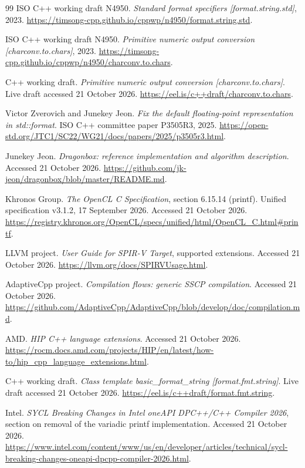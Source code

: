 \documentclass[11pt,letterpaper]{article}
\begin{document}
\begin{thebibliography}{99}
ISO C++ working draft N4950.
\emph{Standard format specifiers [format.string.std]}, 2023.
\url{https://timsong-cpp.github.io/cppwp/n4950/format.string.std}.

ISO C++ working draft N4950.
\emph{Primitive numeric output conversion [charconv.to.chars]}, 2023.
\url{https://timsong-cpp.github.io/cppwp/n4950/charconv.to.chars}.

C++ working draft.
\emph{Primitive numeric output conversion [charconv.to.chars]}.
Live draft accessed 21 October 2026.
\url{https://eel.is/c++draft/charconv.to.chars}.

Victor Zverovich and Junekey Jeon.
\emph{Fix the default floating-point representation in std::format}.
ISO C++ committee paper P3505R3, 2025.
\url{https://open-std.org/JTC1/SC22/WG21/docs/papers/2025/p3505r3.html}.

Junekey Jeon.
\emph{Dragonbox: reference implementation and algorithm description}.
Accessed 21 October 2026.
\url{https://github.com/jk-jeon/dragonbox/blob/master/README.md}.

Khronos Group.
\emph{The OpenCL C Specification}, section 6.15.14 (printf).
Unified specification v3.1.2, 17 September 2026. Accessed 21 October 2026.
\url{https://registry.khronos.org/OpenCL/specs/unified/html/OpenCL_C.html#printf}.

LLVM project.
\emph{User Guide for SPIR-V Target}, supported extensions.
Accessed 21 October 2026.
\url{https://llvm.org/docs/SPIRVUsage.html}.


AdaptiveCpp project.
\emph{Compilation flows: generic SSCP compilation}.
Accessed 21 October 2026.
\url{https://github.com/AdaptiveCpp/AdaptiveCpp/blob/develop/doc/compilation.md}.

AMD.
\emph{HIP C++ language extensions}.
Accessed 21 October 2026.
\url{https://rocm.docs.amd.com/projects/HIP/en/latest/how-to/hip_cpp_language_extensions.html}.


C++ working draft. \emph{Class template basic\_format\_string [format.fmt.string]}.
Live draft accessed 21 October 2026.
\url{https://eel.is/c++draft/format.fmt.string}.

Intel. \emph{SYCL Breaking Changes in Intel oneAPI DPC++/C++ Compiler 2026},
section on removal of the variadic printf implementation. Accessed 21 October 2026.
\url{https://www.intel.com/content/www/us/en/developer/articles/technical/sycl-breaking-changes-oneapi-dpcpp-compiler-2026.html}.


\end{thebibliography}
\end{document}
